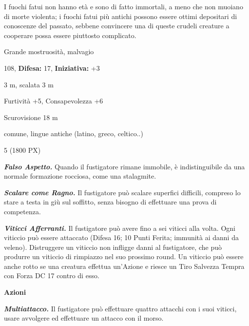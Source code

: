 \begin{multicols}{2}
{I fuochi fatui non hanno età e sono di fatto immortali, a meno che non muoiano di morte violenta; i fuochi fatui più antichi possono essere ottimi depositari di conoscenze del passato, sebbene convincere una di queste crudeli creature a cooperare possa essere piuttosto complicato.

\noindent
\begin{description}[noitemsep, topsep=0pt, parsep=0pt, partopsep=0pt, leftmargin=0cm, labelwidth=2.2cm]
	\item[\textbf{Taglia/Tipo:}] Grande mostruosità, malvagio
	\item[\textbf{Caratt.:}] 
	\item[\textbf{Punti Ferita:}] 108,  \textbf{Difesa:} 17,  \textbf{Iniziativa:} +3
	\item[\textbf{Movimento:}] 3 m, scalata 3 m
	\item[\textbf{Tiri Salvez.:}] 
	\item[\textbf{Comp.:}] Furtività +5, Consapevolezza +6
	\item[\textbf{Sensi:}] Scurovisione 18 m
	\item[\textbf{Linguaggi:}] comune, lingue antiche (latino, greco, celtico..)
	\item[\textbf{Sfida:}] 5 (1800 PX)\smallskip
\end{description}

\emph{\textbf{Falso Aspetto.}} Quando il fustigatore rimane immobile, è indistinguibile da una normale formazione rocciosa, come una stalagmite.

\emph{\textbf{Scalare come Ragno.}} Il fustigatore può scalare superfici difficili, compreso lo stare a testa in giù sul soffitto, senza bisogno di effettuare una prova di competenza.

\emph{\textbf{Viticci Afferranti.}} Il fustigatore può avere fino a sei viticci alla volta. Ogni viticcio può essere attaccato (Difesa 16; 10 Punti Ferita; immunità ai danni da veleno). Distruggere un viticcio non infligge danni al fustigatore, che può produrre un viticcio di rimpiazzo nel suo prossimo round. Un viticcio può essere anche rotto se una creatura effettua un'Azione e riesce un Tiro Salvezza Tempra con Forza DC 17 contro di esso.

\textbf{Azioni}

\emph{\textbf{Multiattacco.}} Il fustigatore può effettuare quattro attacchi con i suoi viticci, usare avvolgere ed effettuare un attacco con il morso.

}
\end{multicols}
